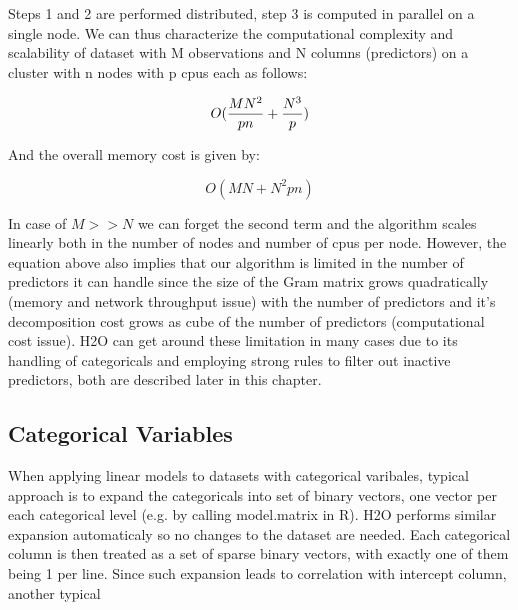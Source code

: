 \documentclass[11pt]{article}
\begin{document}
Steps 1 and 2 are performed distributed, step 3 is computed in parallel on a single node. We can thus characterize the computational complexity and scalability of dataset with M observations and N columns (predictors) on a cluster with n nodes with p cpus each as follows:

\[ O({MN^2 \over pn} + {N^3 \over p})\]

And the overall memory cost is given by:

\[ O(MN + N^2pn)\]

In case of $M >> N$ we can forget the second term and the algorithm scales linearly both in the number of nodes and number of cpus per node. However, the equation above also implies that our algorithm is limited in the number of predictors it can handle since the size of the Gram matrix grows quadratically (memory and network throughput issue) with the number of predictors and it's decomposition cost grows as cube of the number of predictors (computational cost issue). H2O can get around these limitation in many cases due to its handling of categoricals and employing strong rules to filter out inactive predictors, both are described later in this chapter.  

\subsection{Categorical Variables}
When applying linear models to datasets with categorical varibales, typical approach is to expand the categoricals into set of binary vectors, one vector per each categorical level (e.g. by calling model.matrix in R). H2O performs similar expansion automaticaly so no changes to the dataset are needed. Each categorical column is then treated as a set of sparse binary vectors, with exactly one of them being 1 per line. Since such expansion leads to correlation with intercept column, another typical 
\end{document}
